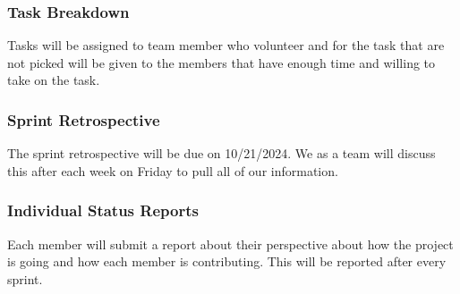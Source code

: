 \subsubsection{Task Breakdown}
Tasks will be assigned to team member who volunteer and for the task that are not picked will be given to the members that have enough time and willing to take on the task.





\subsubsection{Sprint Retrospective}
The sprint retrospective will be due on 10/21/2024. We as a team will discuss this after each week on Friday to pull all of our information.

\subsubsection{Individual Status Reports}
Each member will submit a report about their perspective about how the project is going and how each member is contributing. This will be reported after every sprint.

